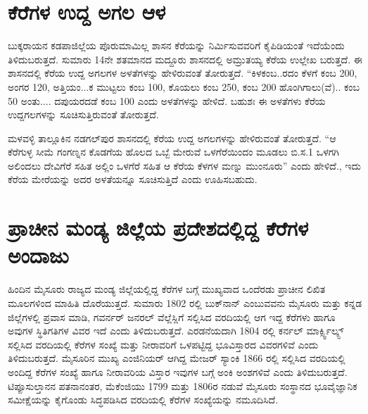 \section*{ಕೆರೆಗಳ ಉದ್ದ ಅಗಲ ಆಳ}

ಬುಕ್ಕರಾಯನ ಕಡಪಾಜಿಲ್ಲೆಯ ಪೊರುಮಾಮಿಲ್ಲ ಶಾಸನ ಕೆರೆಯನ್ನು ನಿರ್ಮಿಸುವವರಿಗೆ ಕೈಪಿಡಿಯಂತೆ ಇದೆಯೆಂದು ತಿಳಿದು\-ಬರುತ್ತದೆ. ಸುಮಾರು 14ನೇ ಶತಮಾನದ ಮದ್ದೂರು ಶಾಸನದಲ್ಲಿ ಅಮ್ರುತಯ್ಯ ಕೆರೆಯ ಉಲ್ಲೇಖ ಬರುತ್ತದೆ. ಈ ಶಾಸನದಲ್ಲಿ ಕೆರೆಯ ಉದ್ದ ಅಗಲಗಳ ಅಳತೆಗಳನ್ನು ಹೇಳಿರುವಂತೆ ತೋರುತ್ತದೆ. “ಕಿಳಕಂಬ..ರದಂ ಕೆಳಗೆ ಕಂಬ 200, ಅಂಗರ 120, ಅತ್ತಿಯಂ...ಕ ಮುಟ್ಟಲು ಕಂಬ 100, ಕೊಯಲು ಕಂಬ 250, ಕಂಬ 200 ಹೊಂಗಿಗಾಲು(ವೆ).. ಕಂಬ 50 ಅಂತು.... ದಪುಯರದಡೆ ಕಂಬ 100 ಎಂದು ಅಳತೆಗಳನ್ನು ಹೇಳಿದೆ. ಬಹುಶಃ ಈ ಅಳತೆಗಳು ಕೆರೆಯ ಉದ್ದಗಲಗಳನ್ನು ಸೂಚಿಸುತ್ತಿರುವಂತೆ ತೋರುತ್ತದೆ.

ಮಳವಳ್ಳಿ ತಾಲ್ಲೂಕಿನ ನಡಗಲ್​ಪುರ ಶಾಸನದಲ್ಲಿ ಕೆರೆಯ ಉದ್ದ ಅಗಲಗಳನ್ನು ಹೇಳಿರುವಂತೆ ತೋರುತ್ತದೆ. “ಆ ಕೆರೆಗುಳ್ಳ ಸೀಮೆ ಗಂಗಣ್ನನ ಕೊಡಗೆಯ ಹೊಲದ ಒಬ್ಬೆ ಮೇರುವೆ ಒಳಗೆರೆಯಿಂದಂ ಮೂಡಲು ಬಿ.ಸ.1 ಒಳಗಗಿ ಅಲಿಂದಲು ದೇವಿಗೆರೆ ಸಹಿತ ಅಲ್ಲಿಂ ಒಳಗೆರೆ ಸಹಿತ ಆ ಕೆರೆಯ ಕೆಳಗಳ ಮಣ್ನು ಮುಂನೂರು” ಎಂದು ಹೇಳಿದೆ., ಇದು ಕೆರೆಯ ಮೇರೆಯನ್ನು ಅದರ ಅಳತೆಯನ್ನೂ ಸೂಚಿಸುತ್ತಿದೆ ಎಂದು ಊಹಿಸಬಹುದು.


\section*{ಪ್ರಾಚೀನ ಮಂಡ್ಯ ಜಿಲ್ಲೆಯ ಪ್ರದೇಶದಲ್ಲಿದ್ದ ಕೆರೆಗಳ ಅಂದಾಜು}

ಹಿಂದಿನ ಮೈಸೂರು ರಾಜ್ಯದ ಮಂಡ್ಯ ಜಿಲ್ಲೆಯಲ್ಲಿದ್ದ ಕೆರೆಗಳ ಬಗ್ಗೆ ಮುಖ್ಯವಾದ ಒಂದೆರಡು ಪ್ರಾಚೀನ ಲಿಖಿತ ಮೂಲಗಳಿಂದ ಮಾಹಿತಿ ದೊರೆಯುತ್ತದೆ. ಸುಮಾರು 1802 ರಲ್ಲಿ ಬುಕ್​ನಾನ್​ ಎಂಬುವವನು ಮೈಸೂರು ಮತ್ತು ಕನ್ನಡ ಜಿಲ್ಲೆಗಳಲ್ಲಿ ಪ್ರವಾಸ ಮಾಡಿ, ಗವರ್ನರ್​ ಜನರಲ್​ ವೆಲ್ಲೆಸ್ಲಿಗೆ ಸಲ್ಲಿಸಿದ ವರದಿಯಲ್ಲಿ ಆಗ ಇದ್ದ ಕೆರೆಗಳು ಹಾಗೂ ಅವುಗಳ ಸ್ಥಿತಿಗತಿಗಳ ವಿವರ ಇದೆ ಎಂದು ತಿಳಿದುಬರುತ್ತದೆ. ಎರಡನೆಯದಾಗಿ 1804 ರಲ್ಲಿ ಕರ್ನಲ್​ ಮಾರ್ಕ್ಸ್ವಿಲ್ಕ್ಸ್ ಸಲ್ಲಿಸಿದ ವರದಿಯಲ್ಲಿ ಕೆರೆಗಳ ಸಂಖ್ಯೆ ಮತ್ತು ನೀರಾವರಿಗೆ ಒಳಪಟ್ಟಿದ್ದ ಭೂವಿಸ್ತಾರದ ವಿವರಗಳಿವೆ ಎಂದು ತಿಳಿದುಬರುತ್ತದೆ. ಮೈಸೂರಿನ ಮುಖ್ಯ ಎಂಜಿನಿಯರ್​ ಆಗಿದ್ದ ಮೇಜರ್​ ಸ್ಯಾಂಕಿ 1866 ರಲ್ಲಿ ಸಲ್ಲಿಸಿದ ವರದಿಯಲ್ಲಿ ಅಂದಿದ್ದ ಕೆರೆಗಳ ಸಂಖ್ಯೆ ಹಾಗೂ ನೀರಾವರಿಯ ವಿಸ್ತಾರ ಇವುಗಳ ಬಗ್ಗೆ ಅಂಕಿ ಅಂಶಗಳಿವೆ ಎಂದು ತಿಳಿದುಬರುತ್ತದೆ. ಟಿಪ್ಪೂಸುಲ್ತಾನನ ಪತನಾನಂತರ, ಮೆಕೆಂಜಿಯು 1799 ಮತ್ತು 1806ರ ನಡುವೆ ಮೈಸೂರು ಸಂಸ್ಥಾನದ ಭೂವೈಜ್ಞಾನಿಕ ಸಮೀಕ್ಷೆಯನ್ನು ಕೈಗೊಂಡು ಸಿದ್ಧಪಡಿಸಿದ ವರದಿಯಲ್ಲಿ ಕೆರೆಗಳ ಸಂಖ್ಯೆಯನ್ನು ನಮೂದಿಸಿದೆ.


